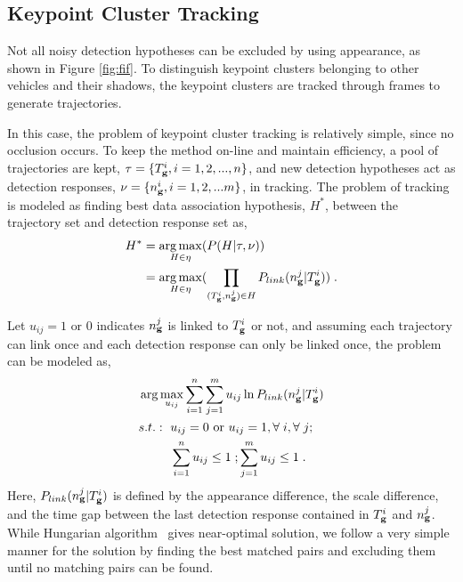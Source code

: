 \subsection{Keypoint Cluster Tracking}
Not all noisy detection hypotheses can be excluded by using appearance, as shown in Figure \ref{fig:fif}. To distinguish keypoint clusters belonging to other vehicles and their shadows, the keypoint clusters are tracked through frames to generate trajectories.

In this case, the problem of keypoint cluster tracking  is relatively simple, since no occlusion occurs. To keep the method on-line and maintain efficiency, a pool of trajectories are kept, $\tau=\{T_{\bf{g}}^i,i=1,2,...,n\}$, and new detection hypotheses act as detection responses, $\nu=\{n_{\bf{g}}^i,i=1,2,...m\}$, in tracking. The problem of tracking is modeled as finding best data association hypothesis, $H^*$, between the trajectory set and detection response set as,
\begin{equation}
\begin{aligned}
{H^*} &= \mathop {\arg \max }\limits_{H \in \eta
} (P(H|\tau,\nu )) \\
&= \mathop {\arg \max }\limits_{H \in \eta }
(\prod\limits_{(T_{\bf{g}}^i,n_{\bf{g}}^j) \in H} {P_{link}(n_{\bf{g}}^j|T_{\bf{g}}^i)} ) \;.
\end{aligned}
\label{eq3}
\end{equation}

Let $u_{ij}=1 \mbox{ or } 0$ indicates $n_{\bf{g}}^j$ is linked to $T_{\bf{g}}^i$ or not, and assuming each trajectory can link once and each detection response can only be linked once, the problem can be modeled as,
\[
\begin{aligned}
&\arg \max\limits_{u_{ij}} \sum\limits_{i = 1}^n \sum\limits_{j = 1}^m u_{ij} \ln P_{link}(n_{\bf{g}}^j|T_{\bf{g}}^i)\\
&
\begin{aligned}
    s.t.:\mbox{ }&u_{ij}=0\mbox{ or }u_{ij}=1,\forall\;i,\forall\;j;\\
    &\sum\limits_{i = 1}^n {u_{ij}} \leq 1\;; \sum\limits_{j = 1}^m {u_{ij}}\leq 1\;.
\end{aligned}
\end{aligned}
\]
Here, $P_{link}(n_{\bf{g}}^j|T_{\bf{g}}^i)$ is defined by the appearance difference, the scale difference, and the time gap between the last detection response contained in $T_{\bf{g}}^i$ and $n_{\bf{g}}^j$. While Hungarian algorithm~\cite{ha} gives near-optimal solution, we follow a very simple manner for the solution by finding the best matched pairs and excluding them until no matching pairs can be found.

